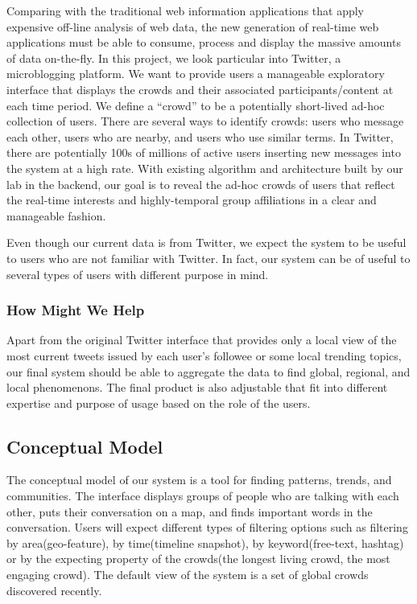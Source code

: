 \documentclass{sig-alternate}
\begin{document}
Comparing with the traditional web information applications that apply
expensive off-line analysis of web data, the new generation of real-time web
applications must be able to consume, process and display the massive amounts
of data on-the-fly. In this project, we look particular into Twitter, a
microblogging platform. We want to provide users a manageable
exploratory interface that displays the crowds and their associated
participants/content at each time period.  We define a ``crowd'' to be a
potentially short-lived ad-hoc collection of users.  There are several ways to
identify crowds: users who message each other, users who are nearby, and users
who use similar terms. In Twitter, there are potentially 100s of millions of
active users inserting new messages into the system at a high rate. With
existing algorithm and architecture built by our lab in the backend, our goal
is to reveal the ad-hoc crowds of users that reflect the real-time interests
and highly-temporal group affiliations in a clear and manageable fashion.

Even though our current data is from Twitter, we expect the system to be useful
to users who are not familiar with Twitter. In fact, our system can be of
useful to several types of users with different purpose in mind.

\subsubsection{How Might We Help}
Apart from the original Twitter interface that provides only a local view of
the most current tweets issued by each user's followee or some local trending
topics, our final system should be able to aggregate the data to find global,
regional, and local phenomenons. The final product is also adjustable that fit
into different expertise and purpose of usage based on the role of the users.

\subsection{Conceptual Model}
The conceptual model of our system is a tool for finding patterns, trends, and
communities. The interface displays groups of people who are talking with each
other, puts their conversation on a map, and finds important words in the
conversation. Users will expect different types of filtering options such as
filtering by area(geo-feature), by time(timeline snapshot), by
keyword(free-text, hashtag) or by the expecting property of the crowds(the
longest living crowd, the most engaging crowd). The default view of the system
is a set of global crowds discovered recently.
\end{document}
